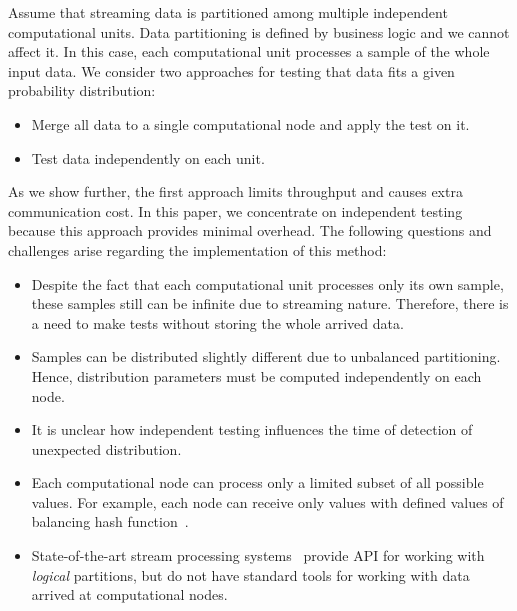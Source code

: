 \label {fs-short-model}

Assume that streaming data is partitioned among multiple independent computational units. Data partitioning is defined by business logic and we cannot affect it. In this case, each computational unit processes a sample of the whole input data. We consider two approaches for testing that data fits a given probability distribution:

\begin{itemize}
    \item Merge all data to a single computational node and apply the test on it.
    \item Test data independently on each unit.
\end{itemize}

As we show further, the first approach limits throughput and causes extra communication cost. In this paper, we concentrate on independent testing because this approach provides minimal overhead. The following questions and challenges arise regarding the implementation of this method:

\begin{itemize}
    \item Despite the fact that each computational unit processes only its own sample, these samples still can be infinite due to streaming nature. Therefore, there is a need to make tests without storing the whole arrived data.
    \item Samples can be distributed slightly different due to unbalanced partitioning. Hence, distribution parameters must be computed independently on each node.
    \item It is unclear how independent testing influences the time of detection of unexpected distribution.
    \item Each computational node can process only a limited subset of all possible values. For example, each node can receive only values with defined values of balancing hash function~\cite{carbone2015apache}.
    \item State-of-the-art stream processing systems~\cite{Carbone:2017:SMA:3137765.3137777, apache:storm, Zaharia:2012:DSE:2342763.2342773} provide API for working with {\em logical} partitions, but do not have standard tools for working with data arrived at computational nodes.
\end{itemize}